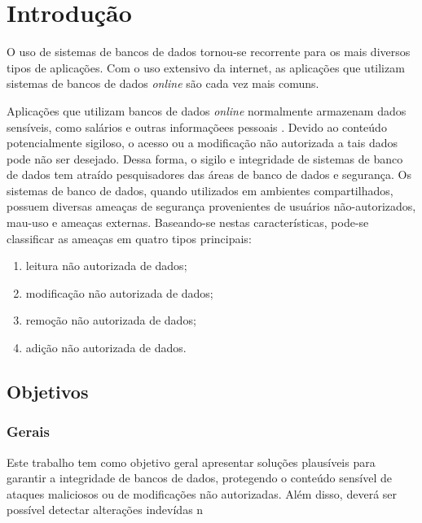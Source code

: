 \chapter{Introdução}
O uso de sistemas de bancos de dados tornou-se recorrente para os mais diversos tipos de aplicações. Com o uso extensivo da internet, as
aplicações que utilizam sistemas de bancos de dados \textit{online} são cada vez mais comuns.

Aplicações que utilizam bancos de dados \textit{online} normalmente armazenam dados sensíveis, como salários e outras informaçõees pessoais \cite{Kamel.integrity.2009}.
Devido ao conteúdo potencialmente sigiloso, o acesso ou a modificação não autorizada a tais dados pode não ser desejado.
Dessa forma, o sigilo e integridade de sistemas de banco de dados tem atraído pesquisadores das áreas de banco de dados e segurança.
Os sistemas de banco de dados, quando utilizados em ambientes compartilhados, possuem diversas ameaças de segurança provenientes de
usuários não-autorizados, mau-uso e ameaças externas. Baseando-se nestas características, pode-se classificar as ameaças em quatro
tipos principais:
\begin{enumerate}
 \item leitura não autorizada de dados;
 \item modificação não autorizada de dados;
 \item remoção não autorizada de dados;
 \item adição não autorizada de dados.
\end{enumerate}

\section{Objetivos}

\subsection{Gerais}
Este trabalho tem como objetivo geral apresentar soluções plausíveis para garantir a integridade de bancos de dados, protegendo o conteúdo sensível 
de ataques maliciosos ou de modificações não autorizadas. Além disso, deverá ser possível detectar alterações indevídas n

